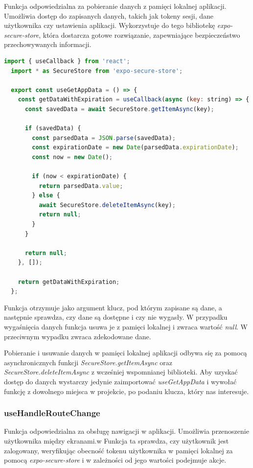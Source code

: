 Funkcja odpowiedzialna za pobieranie danych z pamięci lokalnej aplikacji. Umożliwia dostęp do zapisanych danych, takich jak tokeny sesji, dane użytkownika czy ustawienia aplikacji. Wykorzystuje do tego bibliotekę \textit{expo-secure-store}, która dostarcza gotowe rozwiązanie, zapewniające bezpieczeństwo przechowywanych informacji. 
    
\begin{lstlisting}[language=JavaScript, caption=useGetAppDataHook, label=lst:hook_get_data]
  import { useCallback } from 'react';
  import * as SecureStore from 'expo-secure-store';
  
  export const useGetAppData = () => {
    const getDataWithExpiration = useCallback(async (key: string) => {
      const savedData = await SecureStore.getItemAsync(key);
  
      if (savedData) {
        const parsedData = JSON.parse(savedData);
        const expirationDate = new Date(parsedData.expirationDate);
        const now = new Date();
  
        if (now < expirationDate) {
          return parsedData.value;
        } else {
          await SecureStore.deleteItemAsync(key);
          return null;
        }
      }
  
      return null;
    }, []);
  
    return getDataWithExpiration;
  };      
\end{lstlisting}

Funkcja otrzymuje jako argument klucz, pod którym zapisane są dane, a następnie sprawdza, czy dane są dostępne i czy nie wygasły. W przypadku wygaśnięcia danych funkcja usuwa je z pamięci lokalnej i zwraca wartość \textit{null}. W przeciwnym wypadku zwraca zdekodowane dane. 

Pobieranie i usuwanie danych w pamięci lokalnej aplikacji odbywa się za pomocą asynchronicznych funkcji \textit{SecureStore.getItemAsync} oraz \textit{SecureStore.deleteItemAsync} z wcześniej wspomnianej biblioteki. Aby uzyskać dostęp do danych wystarczy jedynie zaimportować \textit{useGetAppData} i wywołać funkcję z dowolnego miejsca w projekcie, po podaniu klucza, który nas interesuje.

\subsubsection{useHandleRouteChange} 

Funkcja odpowiedzialna za obsługę nawigacji w aplikacji. Umożliwia przenoszenie użytkownika między ekranami.w Funkcja ta sprawdza, czy użytkownik jest zalogowany, weryfikując obecność tokenu użytkownika w pamięci lokalnej za pomocą \textit{expo-secure-store} i w zależności od jego wartości podejmuje akcje.
      
